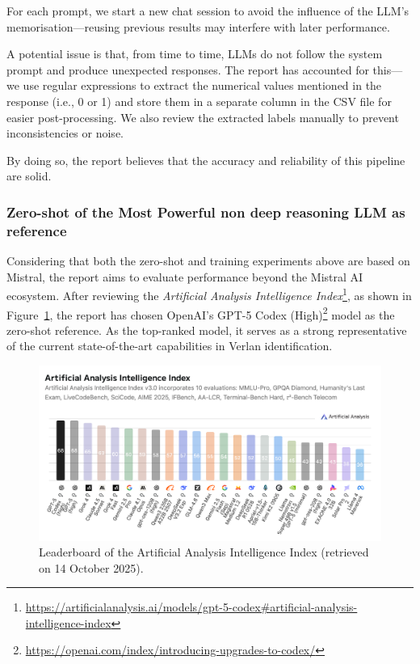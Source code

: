 \documentclass[12pt]{article}
\begin{document}
For each prompt, we start a new chat session to avoid the influence of the LLM's memorisation\;---\;reusing previous results may interfere with later performance.

A potential issue is that, from time to time, LLMs do not follow the system prompt and produce unexpected responses. The report has accounted for this\;---\;we use regular expressions to extract the numerical values mentioned in the response (i.e., 0 or 1) and store them in a separate column in the CSV file for easier post-processing. We also review the extracted labels manually to prevent inconsistencies or noise.

By doing so, the report believes that the accuracy and reliability of this pipeline are solid.

\subsubsection{Zero-shot of the Most Powerful non deep reasoning LLM as reference}

Considering that both the zero-shot and training experiments above are based on Mistral, the report aims to evaluate performance beyond the Mistral AI ecosystem. After reviewing the \textit{Artificial Analysis Intelligence Index}\footnote{\url{https://artificialanalysis.ai/models/gpt-5-codex\#artificial-analysis-intelligence-index}}, as shown in Figure~\ref{fig:AI_Index}, the report has chosen OpenAI's GPT-5 Codex (High)\footnote{\url{https://openai.com/index/introducing-upgrades-to-codex/}} model as the zero-shot reference. As the top-ranked model, it serves as a strong representative of the current state-of-the-art capabilities in Verlan identification.

\begin{figure}[H]
\centering
\includegraphics[width=15cm]{figures/Artificial Analysis Intelligence Index (14 Oct '25) .png}
\caption{\label{fig:AI_Index}Leaderboard of the Artificial Analysis Intelligence Index (retrieved on 14 October 2025).}
\end{figure}
\end{document}
